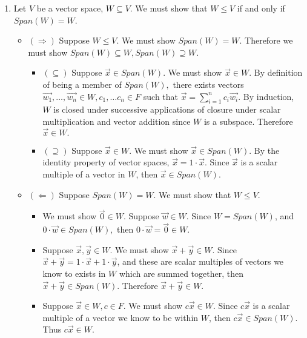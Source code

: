 \documentclass[12pt, letterpaper]{article}
\begin{document}
\begin{enumerate}
		\item Let $V$ be a vector space, $W \subseteq V$.  We must show that $W \leq V$ if and only if $Span(W) = W$.  
		\begin{itemize}
			\item $(\Rightarrow)$ Suppose $W \leq V$.  We must show $Span(W) = W$.  Therefore we must show $Span(W) \subseteq W, Span(W) \supseteq W$.
			\begin{itemize}
				\item $(\subseteq)$ Suppose $\Vec{x} \in Span(W)$.  We must show $\Vec{x} \in W$.  By definition of being a member of $Span(W),$ there exists vectors $\Vec{w_1},\ldots,\Vec{w_n} \in W, c_1,\ldots c_n \in F$ such that $\Vec{x} = \sum^n_{i=1} c_i \Vec{w_i}$.  By induction, $W$ is closed under successive applications of closure under scalar multiplication and vector addition since $W$ is a subspace.  Therefore $\Vec{x} \in W.$
				\item $(\supseteq)$ Suppose $\Vec{x} \in W$.  We must show $\Vec{x} \in Span(W)$. By the identity property of vector spaces, $\Vec{x} = 1 \cdot \Vec{x}$.  Since $\Vec{x}$ is a scalar multiple of a vector in $W$, then $\Vec{x} \in Span(W)$. 
			\end{itemize}
			\item $(\Leftarrow)$ Suppose $Span(W) = W$.  We must show that $W \leq V$.  
			\begin{itemize}
				\item We must show $\Vec{0} \in W.$  Suppose $\Vec{w} \in W.$  Since $W = Span(W)$, and $0 \cdot \Vec{w} \in Span(W),$ then $0\cdot \Vec{w} = \Vec{0} \in W$.
				\item Suppose $\Vec{x}, \Vec{y} \in W.$  We must show $\Vec{x} + \Vec{y} \in W.$  Since $\Vec{x} + \Vec{y} = 1 \cdot \Vec{x} + 1 \cdot \Vec{y}$, and these are scalar multiples of vectors we know to exists in $W$ which are summed together, then $\Vec{x} + \Vec{y} \in Span(W)$.  Therefore $\Vec{x} + \Vec{y} \in W$.
				\item Suppose $\Vec{x} \in W, c \in F$.  We must show $c \Vec{x} \in W$.  Since $c \Vec{x}$ is a scalar multiple of a vector we know to be within $W$, then $c \Vec{x} \in Span(W)$. Thus $c \Vec{x} \in W$.
			\end{itemize}					   
		\end{itemize}
	\end{enumerate}
\end{document}
